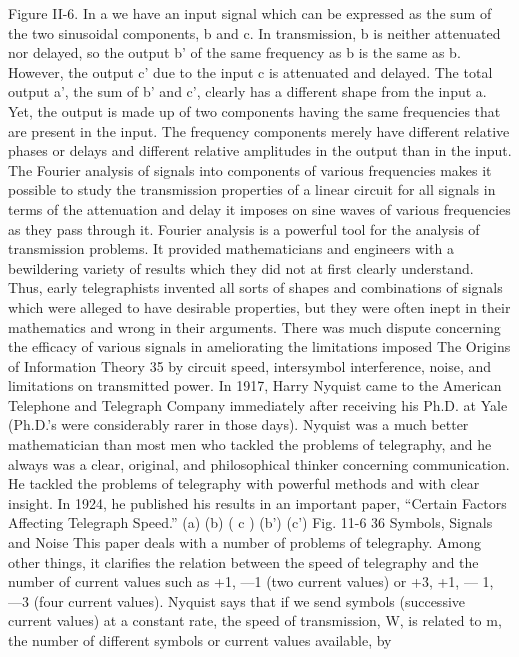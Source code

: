 Figure II-6. In a we have an input signal which can be expressed
as the sum of the two sinusoidal components, b and c. In transmission,
b is neither attenuated nor delayed, so the output b' of
the same frequency as b is the same as b. However, the output c'
due to the input c is attenuated and delayed. The total output a',
the sum of b' and c', clearly has a different shape from the input
a. Yet, the output is made up of two components having the same
frequencies that are present in the input. The frequency components
merely have different relative phases or delays and different
relative amplitudes in the output than in the input.
The Fourier analysis of signals into components of various frequencies
makes it possible to study the transmission properties of
a linear circuit for all signals in terms of the attenuation and delay
it imposes on sine waves of various frequencies as they pass
through it.
Fourier analysis is a powerful tool for the analysis of transmission
problems. It provided mathematicians and engineers with a
bewildering variety of results which they did not at first clearly
understand. Thus, early telegraphists invented all sorts of shapes
and combinations of signals which were alleged to have desirable
properties, but they were often inept in their mathematics and
wrong in their arguments. There was much dispute concerning the
efficacy of various signals in ameliorating the limitations imposed
The Origins of Information Theory
35
by circuit speed, intersymbol interference, noise, and limitations
on transmitted power.
In 1917, Harry Nyquist came to the American Telephone and
Telegraph Company immediately after receiving his Ph.D. at Yale
(Ph.D.’s were considerably rarer in those days). Nyquist was a
much better mathematician than most men who tackled the problems
of telegraphy, and he always was a clear, original, and
philosophical thinker concerning communication. He tackled the
problems of telegraphy with powerful methods and with clear
insight. In 1924, he published his results in an important paper,
“Certain Factors Affecting Telegraph Speed.”
(a)
(b)
( c )
(b')
(c')
Fig. 11-6
36 Symbols, Signals and Noise
This paper deals with a number of problems of telegraphy.
Among other things, it clarifies the relation between the speed of
telegraphy and the number of current values such as +1, —1
(two current values) or +3, +1, — 1, —3 (four current values).
Nyquist says that if we send symbols (successive current values)
at a constant rate, the speed of transmission, W, is related to m,
the number of different symbols or current values available, by

